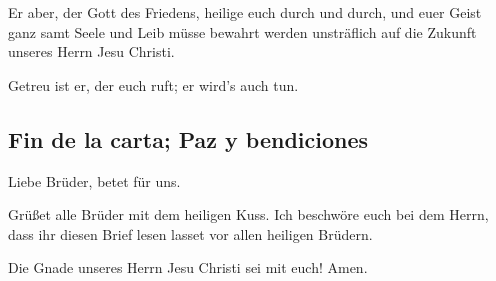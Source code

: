  Er aber, der Gott des Friedens, heilige euch durch und
durch, und euer Geist ganz samt Seele und Leib müsse bewahrt werden
unsträflich auf die Zukunft unseres Herrn Jesu Christi.

 Getreu ist er, der euch ruft; er wird's auch tun.

\hypertarget{fin-de-la-carta-paz-y-bendiciones}{%
\subsection{Fin de la carta; Paz y
bendiciones}\label{fin-de-la-carta-paz-y-bendiciones}}

 Liebe Brüder, betet für uns.

 Grüßet alle Brüder mit dem heiligen Kuss.
 Ich beschwöre euch bei dem Herrn, dass ihr diesen Brief
lesen lasset vor allen heiligen Brüdern.

 Die Gnade unseres Herrn Jesu Christi sei mit euch! Amen.

